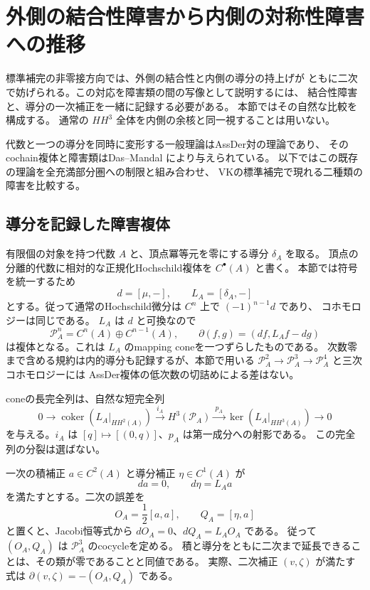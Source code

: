 \section{外側の結合性障害から内側の対称性障害への推移}
\label{sec:obstruction-transgression-v40}

標準補完の非零接方向では、外側の結合性と内側の導分の持上げが
ともに二次で妨げられる。この対応を障害類の間の写像として説明するには、
結合性障害と、導分の一次補正を一緒に記録する必要がある。
本節ではその自然な比較を構成する。
通常の $HH^3$ 全体を内側の余核と同一視することは用いない。

代数と一つの導分を同時に変形する一般理論はAssDer対の理論であり、
そのcochain複体と障害類はDas--Mandal
\cite[\S2.1, Proposition~4.9, Theorem~4.10]{DasMandal2026}により与えられている。
以下ではこの既存の理論を全充満部分圏への制限と組み合わせ、
VKの標準補完で現れる二種類の障害を比較する。

\subsection{導分を記録した障害複体}

有限個の対象を持つ代数 $A$ と、頂点冪等元を零にする導分 $\delta_A$ を取る。
頂点の分離的代数に相対的な正規化Hochschild複体を $C^\bullet(A)$ と書く。
本節では符号を統一するため
\[
 d=[\mu,-],\qquad L_A=[\delta_A,-]
\]
とする。従って通常のHochschild微分は $C^n$ 上で $(-1)^{n-1}d$ であり、
コホモロジーは同じである。
$L_A$ は $d$ と可換なので
\begin{equation}
 \mathcal P_A^n=C^n(A)\oplus C^{n-1}(A),\qquad
 \partial(f,g)=(df,L_Af-dg)
 \label{eq:pair-cone-v40}
\end{equation}
は複体となる。これは $L_A$ のmapping coneを一つずらしたものである。
次数零まで含める規約は内的導分も記録するが、本節で用いる
$\mathcal P_A^2\to\mathcal P_A^3\to\mathcal P_A^4$ と三次コホモロジーには
AssDer複体の低次数の切詰めによる差はない。

coneの長完全列は、自然な短完全列
\begin{equation}
 0\longrightarrow
 \operatorname{coker}(L_A|_{HH^2(A)})
 \xrightarrow{\ i_A\ }H^3(\mathcal P_A)
 \xrightarrow{\ p_A\ }
 \ker(L_A|_{HH^3(A)})
 \longrightarrow0
 \label{eq:pair-obstruction-extension-v40}
\end{equation}
を与える。$i_A$ は $[q]\mapsto[(0,q)]$、$p_A$ は第一成分への射影である。
この完全列の分裂は選ばない。

一次の積補正 $a\in C^2(A)$ と導分補正 $\eta\in C^1(A)$ が
\[
 da=0,\qquad d\eta=L_Aa
\]
を満たすとする。二次の誤差を
\begin{equation}
 O_A=\frac12[a,a],\qquad Q_A=[\eta,a]
 \label{eq:enhanced-primary-obstruction-v40}
\end{equation}
と置くと、Jacobi恒等式から
$dO_A=0$、$dQ_A=L_AO_A$ である。
従って $(O_A,Q_A)$ は $\mathcal P_A^3$ のcocycleを定める。
積と導分をともに二次まで延長できることは、その類が零であることと同値である。
実際、二次補正 $(v,\zeta)$ が満たす式は
$\partial(v,\zeta)=-(O_A,Q_A)$ である。

